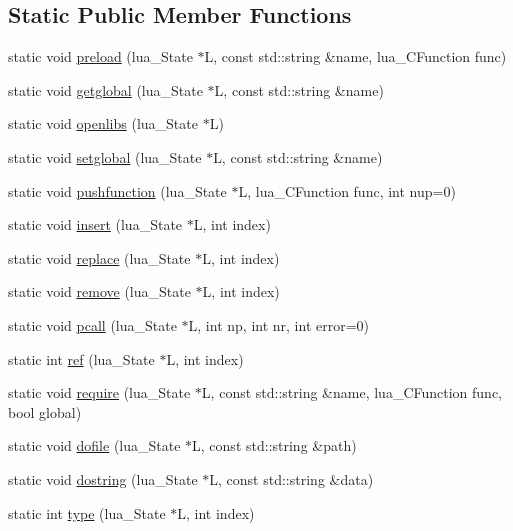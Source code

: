 \subsection*{Static Public Member Functions}
\begin{DoxyCompactItemize}
\item 
static void \hyperlink{a00040_a9eb8ef593142ef0426333ccc27123389}{preload} (lua\-\_\-\-State $\ast$L, const std\-::string \&name, lua\-\_\-\-C\-Function func)
\item 
static void \hyperlink{a00040_acff64921d4606b5d748667e628fcf826}{getglobal} (lua\-\_\-\-State $\ast$L, const std\-::string \&name)
\item 
static void \hyperlink{a00040_a2b2890895bec345ace801de2cb264570}{openlibs} (lua\-\_\-\-State $\ast$L)
\item 
static void \hyperlink{a00040_ab5aa9585473675b41051dfccd381a17f}{setglobal} (lua\-\_\-\-State $\ast$L, const std\-::string \&name)
\item 
static void \hyperlink{a00040_a956117e4506cb18ca82eeea6dc60bccd}{pushfunction} (lua\-\_\-\-State $\ast$L, lua\-\_\-\-C\-Function func, int nup=0)
\item 
static void \hyperlink{a00040_a333d4e204180f5a56121a541bf8b0cd5}{insert} (lua\-\_\-\-State $\ast$L, int index)
\item 
static void \hyperlink{a00040_a85f60ff6c338e4be4711117d083205c1}{replace} (lua\-\_\-\-State $\ast$L, int index)
\item 
static void \hyperlink{a00040_a86e448fd744d2f03497fbb6910fbeef4}{remove} (lua\-\_\-\-State $\ast$L, int index)
\item 
static void \hyperlink{a00040_aab7ca5e15dddf31aa5289868f6ec43da}{pcall} (lua\-\_\-\-State $\ast$L, int np, int nr, int error=0)
\item 
static int \hyperlink{a00040_a45fbc62bc87b144ae1ff6635e3d29c4e}{ref} (lua\-\_\-\-State $\ast$L, int index)
\item 
static void \hyperlink{a00040_a18fd156d92363044f9946d435f26e5b8}{require} (lua\-\_\-\-State $\ast$L, const std\-::string \&name, lua\-\_\-\-C\-Function func, bool global)
\item 
static void \hyperlink{a00040_a651af5503c346f3513066418463105b5}{dofile} (lua\-\_\-\-State $\ast$L, const std\-::string \&path)
\item 
static void \hyperlink{a00040_ae80084c0495225f2d86bb11f6e060c6a}{dostring} (lua\-\_\-\-State $\ast$L, const std\-::string \&data)
\item 
static int \hyperlink{a00040_a3169e5668debd4dfb3c3618cb0bec056}{type} (lua\-\_\-\-State $\ast$L, int index)

\end{DoxyCompactItemize}
